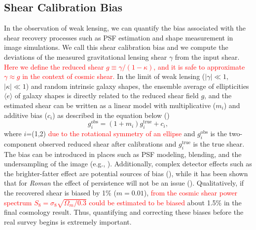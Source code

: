 \documentclass[fleqn,usenatbib]{mnras}
\begin{document}

\subsection{Shear Calibration Bias}
In the observation of weak lensing, we can quantify the bias associated with the shear recovery processes such as PSF estimation and shape measurement in image simulations. We call this shear calibration bias and we compute the deviations of the measured gravitational lensing shear $\gamma$ from the input shear. \textcolor{red}{Here we define the reduced shear $g \equiv \gamma/(1-\kappa)$, and it is safe to approximate $\gamma \approx g$ in the context of cosmic shear.} In the limit of weak lensing ($\lvert\gamma\rvert\ll1$, $\lvert\kappa\rvert\ll1$) and random intrinsic galaxy shapes, the ensemble average of ellipticities $\langle e \rangle$ of galaxy shapes is directly related to the reduced shear field $g$, and the estimated shear can be written as a linear model with multiplicative ($m_{i}$) and additive bias ($c_{i}$) as described in the equation below (\citealt{2006MNRAS.368.1323H, 2006MNRAS.366..101H, 2007MNRAS.376...13M}) 
\begin{equation}
    g^{\textrm{obs}}_{i} = (1+m_{i})g^{\textrm{true}}_{i} + c_{i}, 
    \label{eqn:linear}
\end{equation}
where $i$=(1,2) \textcolor{red}{due to the rotational symmetry of an ellipse} and $g^{\textrm{obs}}_{i}$ is the two-component observed reduced shear after calibrations and $g^{\textrm{true}}_{i}$ is the true shear. The bias can be introduced in places such as PSF modeling, blending, and the undersampling of the image (e.g., \citealt{2018ARA&A..56..393M}). Additionally, complex detector effects such as the brighter-fatter effect are potential sources of bias (\citealt{2020PASP..132a4502C}), while it has been shown that for \emph{Roman} the effect of persistence will not be an issue (\citealt{2021arXiv210610273L}). Qualitatively, if the recovered shear is biased by 1$\%$ ($m=0.01$), \textcolor{red}{from the cosmic shear power spectrum $S_{8} = \sigma_{8} \sqrt{\Omega_{m}/0.3}$ could be estimated to be biased} about 1.5$\%$ in the final cosmology result. Thus, quantifying and correcting these biases before the real survey begins is extremely important. 
\end{document}
